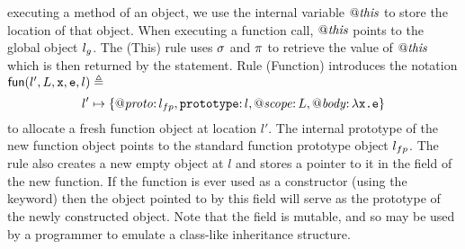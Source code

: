 \documentclass{article}
\begin{document}
executing a method of an object, we use the internal variable $\mathit{@this}$
to store the location of that object. When executing a function call,
$\mathit{@this}$ points to the global object $l_g$. The (This) rule uses
$\sigma$ and $\pi$ to retrieve the value of $\mathit{@this}$ which is then
returned by the  statement.
%
%
Rule (Function) introduces the notation $\mathsf{fun}(l',L,\mbox{\texttt{{\upshape x}}},\mbox{\texttt{{\upshape e}}},l)\triangleq$
\[ l'\mapsto\{\mathit{@proto}{:\,}l_{fp},\mbox{\texttt{{\upshape prototype}}}{:\,} l,\mathit{@scope}{:\,} L,\mathit{@body}{:\,}\lambda \mbox{\texttt{{\upshape x.e}}}\}\]
to allocate a fresh function object at location $l'$. The internal
prototype of the new function object points to the standard function
prototype object $l_{fp}$. The rule also creates a new empty object at
$l$ and stores a pointer to it in the  field of the new
function. If the function is ever used as a constructor (using the
 keyword) then the object pointed to by this 
field will serve as the prototype of the newly constructed object.
Note that the field is mutable, and so may be used by a programmer to
emulate a class-like inheritance structure.
\end{document}
